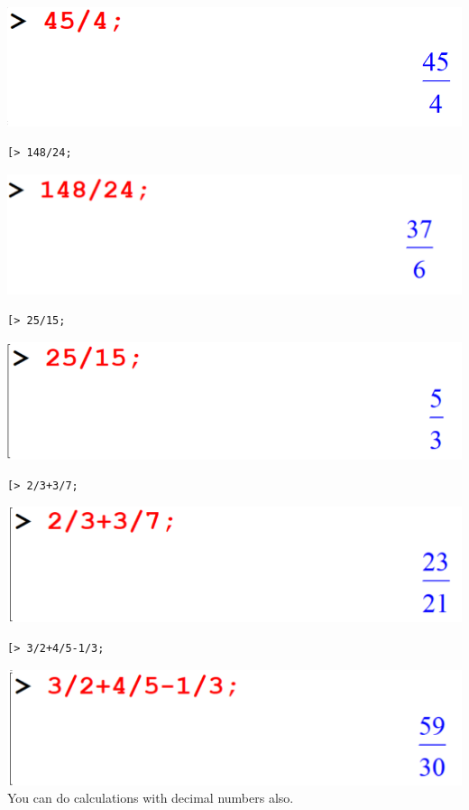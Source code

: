 \documentclass[
]{book}
\theoremstyle{definition}
\theoremstyle{definition}
\theoremstyle{definition}
\theoremstyle{definition}
\theoremstyle{remark}
\begin{document}
\includegraphics{figures/Lesson 1/fig19.png}

\begin{verbatim}
[> 148/24;
\end{verbatim}

\includegraphics{figures/Lesson 1/fig20.png}

\begin{verbatim}
[> 25/15;
\end{verbatim}

\includegraphics{figures/Lesson 1/fig21.png}

\begin{verbatim}
[> 2/3+3/7;
\end{verbatim}

\includegraphics{figures/Lesson 1/fig22.png}

\begin{verbatim}
[> 3/2+4/5-1/3;
\end{verbatim}

\includegraphics{figures/Lesson 1/fig23.png}
You can do calculations with decimal numbers also.
\end{document}
